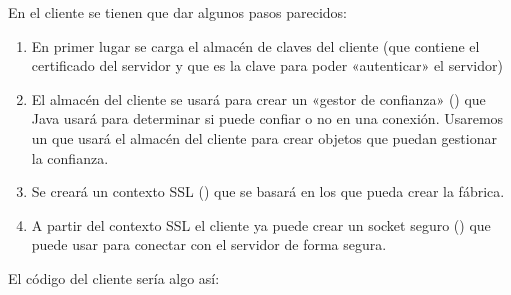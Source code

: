 \documentclass[letterpaper,10pt,spanish]{sphinxmanual}
\begin{document}
\begin{sphinxVerbatim}[commandchars=\\\{\}]
                         
                             
                     
\end{sphinxVerbatim}

En el cliente se tienen que dar algunos pasos parecidos:
\begin{enumerate}
%
\item {} 
En primer lugar se carga el almacén de claves del cliente (que contiene el certificado del servidor y que es la clave para poder «autenticar» el servidor)

\item {} 
El almacén del cliente se usará para crear un «gestor de confianza» () que Java usará para determinar si puede confiar o no en una conexión. Usaremos un  que usará el almacén del cliente para crear objetos que puedan gestionar la confianza.

\item {} 
Se creará un contexto SSL () que se basará en los  que pueda crear la fábrica.

\item {} 
A partir del contexto SSL el cliente ya puede crear un socket seguro () que puede usar para conectar con el servidor de forma segura.

\end{enumerate}

El código del cliente sería algo así:
\end{document}
